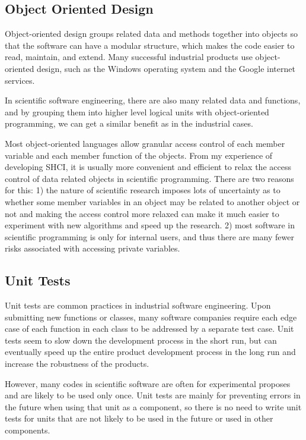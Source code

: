 \subsection{Object Oriented Design}
Object-oriented design groups related data and methods together into objects so that the software can have a modular structure, which makes the code easier to read, maintain, and extend.
Many successful industrial products use object-oriented design, such as the Windows operating system and the Google internet services.

In scientific software engineering, there are also many related data and functions, and by grouping them into higher level logical units with object-oriented programming, we can get a similar benefit as in the industrial cases.

Most object-oriented languages allow granular access control of each member variable and each member function of the objects.
From my experience of developing SHCI, it is usually more convenient and efficient to relax the access control of data related objects in scientific programming.
There are two reasons for this:
1) the nature of scientific research imposes lots of uncertainty as to whether some member variables in an object may be related to another object or not and making the access control more relaxed can make it much easier to experiment with new algorithms and speed up the research.
2) most software in scientific programming is only for internal users, and thus there are many fewer risks associated with accessing private variables.

\subsection{Unit Tests}
Unit tests are common practices in industrial software engineering.
Upon submitting new functions or classes, many software companies require each edge case of each function in each class to be addressed by a separate test case.
Unit tests seem to slow down the development process in the short run, but can eventually speed up the entire product development process in the long run and increase the robustness of the products.

However, many codes in scientific software are often for experimental proposes and are likely to be used only once.
Unit tests are mainly for preventing errors in the future when using that unit as a component, so there is no need to write unit tests for units that are not likely to be used in the future or used in other components.

